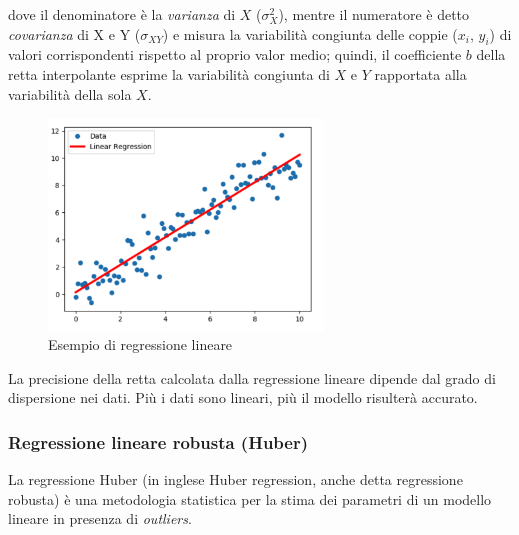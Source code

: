 dove il denominatore è la \textit{varianza} di $X$ ($\sigma_{X}^{2}$), mentre il numeratore è detto \textit{covarianza} di X e Y ($\sigma_{XY}$) e misura la variabilità congiunta delle coppie ($x_i$, $y_i$) di valori corrispondenti rispetto al proprio valor medio; quindi, il coefficiente $b$ della retta interpolante esprime la variabilità congiunta di $X$ e $Y$ rapportata alla variabilità della sola $X$.

\begin{figure}[H]
\centering
\includegraphics[width=0.65\textwidth,height=\textheight,keepaspectratio]{img/lin_reg_example.png}
\caption{Esempio di regressione lineare}
\label{fig:reg_lin}
\end{figure}

La precisione della retta calcolata dalla regressione lineare dipende dal grado di dispersione nei dati. Più i dati sono lineari, più il modello risulterà accurato.

%
%
%

\subsubsection{Regressione lineare robusta (Huber)}\label{sssec:regressione-huber}
La regressione Huber (in inglese Huber regression, anche detta regressione robusta) è una metodologia statistica per la stima dei parametri di un modello lineare in presenza di \textit{outliers}.

